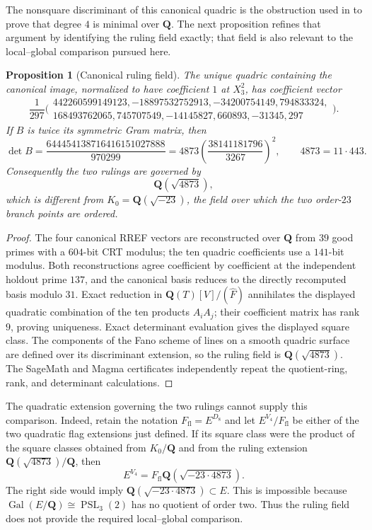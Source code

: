 \documentclass[11pt]{amsart}
\newtheorem{proposition}[proposition]{Proposition}
\theoremstyle{definition}
\theoremstyle{remark}
\newcommand{\QQ}{\mathbf Q}
\newcommand{\Gal}{\operatorname{Gal}}
\newcommand{\PSL}{\operatorname{PSL}}
\begin{document}
The nonsquare discriminant of this canonical quadric is the obstruction used
in \cite[Remark~3.4]{HJLPPZ} to prove that degree $4$ is minimal over $\QQ$.
The next proposition refines that argument by identifying the ruling field
exactly; that field is also relevant to the local--global comparison pursued
here.

\begin{proposition}[Canonical ruling field]
\label{prop:canonical-ruling-field}
The unique quadric containing the canonical image, normalized to have
coefficient $1$ at $X_3^2$, has coefficient vector
\[
\frac1{297}\bigl(
\begin{gathered}
442260599149123,-18897532752913,-34200754149,794833324,\\
168493762065,745707549,-14145827,660893,-31345,297
\end{gathered}
\bigr).
\]
If $B$ is twice its symmetric Gram matrix, then
\[
 \det B=\frac{644454138716416151027888}{970299}
       =4873\left(\frac{38141181796}{3267}\right)^2,
 \qquad 4873=11\cdot443.
\]
Consequently the two rulings are governed by
\[
 \QQ(\sqrt{4873}),
\]
which is different from
$K_0=\QQ(\sqrt{-23})$, the field over which the two order-$23$ branch points
are ordered.
\end{proposition}

\begin{proof}
The four canonical RREF vectors are reconstructed over $\QQ$ from $39$
good primes with a $604$-bit CRT modulus; the ten quadric coefficients use
a $141$-bit modulus.  Both reconstructions agree coefficient by coefficient
at the independent holdout prime $137$, and the canonical basis reduces to
the directly recomputed basis modulo $31$.  Exact reduction in
$\QQ(T)[V]/(\widehat F)$ annihilates the displayed quadratic combination
of the ten products $A_iA_j$; their coefficient matrix has rank $9$, proving
uniqueness.  Exact determinant evaluation gives the displayed square class.
The components of the Fano scheme of lines on a smooth quadric surface are
defined over its discriminant extension, so the ruling field is
$\QQ(\sqrt{4873})$.  The SageMath and Magma certificates independently
repeat the quotient-ring, rank, and determinant calculations.
\end{proof}

The quadratic extension governing the two rulings cannot supply this
comparison.  Indeed, retain the notation
$F_{\mathrm{fl}}=E^{D_8}$ and let $E^{V_4}/F_{\mathrm{fl}}$ be either of
the two quadratic flag extensions just defined.  If its square class were
the product of the square classes obtained from $K_0/\QQ$ and from the
ruling extension $\QQ(\sqrt{4873})/\QQ$, then
\[
 E^{V_4}=F_{\mathrm{fl}}\QQ(\sqrt{-23\cdot4873}).
\]
The right side would imply
$\QQ(\sqrt{-23\cdot4873})\subset E$.  This is impossible because
$\Gal(E/\QQ)\cong\PSL_3(2)$ has no quotient of order two.  Thus the ruling
field does not provide the required local--global comparison.
\end{document}
